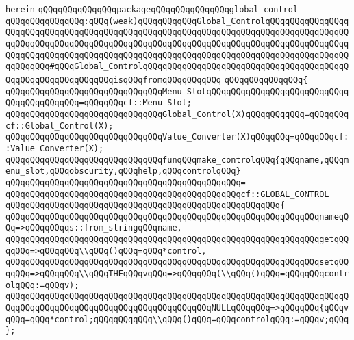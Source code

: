 \verb|herein|\newline
\newline
\verb|qQQqqQQqqQQqqQQqpackageqQQqqQQqqQQqqQQqglobal_control|\newline
\verb|qQQqqQQqqQQqqQQq:qQQq(weak)qQQqqQQqqQQqGlobal_ControlqQQqqQQqqQQqqQQqqQQqqQQqqQQqqQQqqQQqqQQqqQQqqQQqqQQqqQQqqQQqqQQqqQQqqQQqqQQqqQQqqQQqqQQqqQQqqQQqqQQqqQQqqQQqqQQqqQQqqQQqqQQqqQQqqQQqqQQqqQQqqQQqqQQqqQQqqQQqqQQqqQQqqQQqqQQqqQQqqQQqqQQqqQQqqQQqqQQqqQQqqQQqqQQqqQQqqQQqqQQqqQQqqQQqqQQqqQQq#qQQqGlobal_ControlqQQqqQQqqQQqqQQqqQQqqQQqqQQqqQQqqQQqqQQqqQQqqQQqqQQqqQQqqQQqqQQqisqQQqfromqQQqqQQqqQQq|\newline
\verb|qQQqqQQqqQQqqQQq{|\newline
\verb|qQQqqQQqqQQqqQQqqQQqqQQqqQQqqQQqMenu_SlotqQQqqQQqqQQqqQQqqQQqqQQqqQQqqQQqqQQqqQQqqQQq=qQQqqQQqcf::Menu_Slot;|\newline
\verb|qQQqqQQqqQQqqQQqqQQqqQQqqQQqqQQqGlobal_Control(X)qQQqqQQqqQQq=qQQqqQQqcf::Global_Control(X);|\newline
\verb|qQQqqQQqqQQqqQQqqQQqqQQqqQQqqQQqValue_Converter(X)qQQqqQQq=qQQqqQQqcf::Value_Converter(X);|\newline
\newline
\verb|qQQqqQQqqQQqqQQqqQQqqQQqqQQqqQQqfunqQQqmake_controlqQQq{qQQqname,qQQqmenu_slot,qQQqobscurity,qQQqhelp,qQQqcontrolqQQq}|\newline
\verb|qQQqqQQqqQQqqQQqqQQqqQQqqQQqqQQqqQQqqQQqqQQqqQQq=|\newline
\verb|qQQqqQQqqQQqqQQqqQQqqQQqqQQqqQQqqQQqqQQqqQQqqQQqcf::GLOBAL_CONTROL|\newline
\verb|qQQqqQQqqQQqqQQqqQQqqQQqqQQqqQQqqQQqqQQqqQQqqQQqqQQqqQQq{|\newline
\verb|qQQqqQQqqQQqqQQqqQQqqQQqqQQqqQQqqQQqqQQqqQQqqQQqqQQqqQQqqQQqqQQqnameqQQq=>qQQqqQQqqs::from_stringqQQqname,|\newline
\verb|qQQqqQQqqQQqqQQqqQQqqQQqqQQqqQQqqQQqqQQqqQQqqQQqqQQqqQQqqQQqqQQqgetqQQqqQQq=>qQQqqQQq\\qQQq()qQQq=qQQq*control,|\newline
\verb|qQQqqQQqqQQqqQQqqQQqqQQqqQQqqQQqqQQqqQQqqQQqqQQqqQQqqQQqqQQqqQQqsetqQQqqQQq=>qQQqqQQq\\qQQqTHEqQQqvqQQq=>qQQqqQQq(\\qQQq()qQQq=qQQqqQQqcontrolqQQq:=qQQqv);|\newline
\verb|qQQqqQQqqQQqqQQqqQQqqQQqqQQqqQQqqQQqqQQqqQQqqQQqqQQqqQQqqQQqqQQqqQQqqQQqqQQqqQQqqQQqqQQqqQQqqQQqqQQqqQQqqQQqqQQqNULLqQQqqQQq=>qQQqqQQq{qQQqvqQQq=qQQq*control;qQQqqQQqqQQq\\qQQq()qQQq=qQQqcontrolqQQq:=qQQqv;qQQq};|\newline
